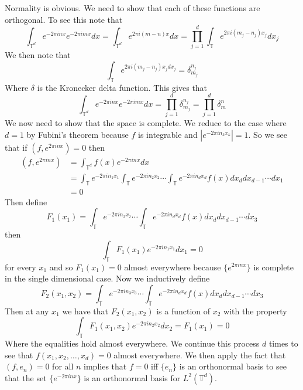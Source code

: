 \documentclass{article}
\newcommand{\problempart}[1]{\noindent{\textbf{(#1)}}}
\begin{document}
\problempart{e} Normality is obvious. We need to show that each of these functions are orthogonal. To see this note that
\[
\int_{\mathbb{T}^d} e^{-2\pi inx}e^{-2\pi imx}dx = \int_{\mathbb{T}^d} e^{2\pi i(m-n)x}dx = \prod_{j=1}^d \int_\mathbb{T} e^{2\pi i(m_j - n_j)x_j}dx_j
\]
We then note that 
\[
\int_\mathbb{T} e^{2\pi i(m_j - n_j)x_jdx_j} = \delta_{m_j}^{n_j}
\]
Where $\delta$ is the Kronecker delta function. This gives that 
\[
\int_{\mathbb{T}^d} e^{-2\pi inx}e^{-2\pi imx}dx =  \prod_{j=1}^d \delta_{m_j}^{n_j} = \prod_{j=1}^d \delta_{m}^{n}
\]
We now need to show that the space is complete. We reduce to the case where $d = 1$ by Fubini's theorem because $f$ is integrable and $|e^{-2\pi in_kx_k}| = 1$. So we see that if $(f, e^{2\pi inx}) = 0$ then
\begin{align*}
(f, e^{2\pi inx}) &= \int_{\mathbb{T}^d} f(x)e^{-2\pi in x}dx \\
&= \int_\mathbb{T} e^{-2\pi in_1x_1}\int_\mathbb{T} e^{-2\pi in_2x_2}\cdots\int_\mathbb{T} e^{-2\pi in_dx_d}f(x)dx_ddx_{d-1}\cdots dx_1\\
&= 0
\end{align*}
Then define 
\[
F_1(x_1) = \int_\mathbb{T} e^{-2\pi in_2x_2}\cdots\int_\mathbb{T} e^{-2\pi in_dx_d}f(x)dx_ddx_{d-1}\cdots dx_3
\]
then 
\[
\int_\mathbb{T} F_1(x_1)e^{-2\pi in_1x_1}dx_1 = 0
\]
for every $x_1$ and so $F_1(x_1) = 0$ almost everywhere because $\{e^{2\pi inx}\}$ is complete in the single dimensional case. Now we inductively define
\[
F_2(x_1,x_2) = \int_\mathbb{T} e^{-2\pi in_3x_3}\cdots\int_\mathbb{T} e^{-2\pi in_dx_d}f(x)dx_ddx_{d-1}\cdots dx_3
\] 
Then at any $x_1$ we have that $F_2(x_1,x_2)$ is a function of $x_2$ with the property
\[
\int_\mathbb{T} F_1(x_1,x_2)e^{-2\pi in_2x_2}dx_2 = F_1(x_1) = 0
\]
Where the equalities hold almost everywhere. We continue this process $d$ times to see that $f(x_1,x_2,\ldots,x_d) = 0$ almost everywhere. We then apply the fact that $(f, e_n) = 0$ for all $n$ implies that $f = 0$ iff $\{e_n\}$ is an orthonormal basis to see that the set $\{e^{-2\pi inx}\}$ is an orthonormal basis for $L^2(\mathbb{T}^d)$.
\end{document}
